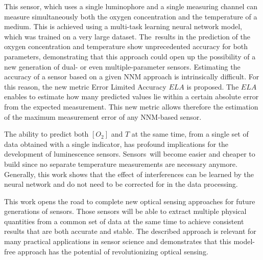 \documentclass[sensors,article,accept,moreauthors,pdftex,10pt,a4paper]{Definitions/mdpi}
\begin{document}
This sensor, which uses a single luminophore and a single measuring channel can measure simultaneously both the oxygen concentration and the temperature of a medium. This is achieved using a multi-task learning neural network model, which was trained on a very large dataset. The~results in the prediction of the oxygen concentration and temperature show unprecedented accuracy for both parameters, demonstrating that this approach could open up the possibility of a new generation of dual- or even multiple-parameter sensors.
Estimating the accuracy of a sensor based on a given NNM approach is intrinsically difficult. For this reason, the new metric Error Limited Accuracy $ELA$ is proposed. The $ELA$ enables to estimate how many predicted values lie within a certain absolute error from the expected measurement. This new metric allows therefore the estimation of the maximum measurement error of any NNM-based sensor.

The ability to predict both $[O_2]$ and $T$ at the same time, from a single set of data obtained with a single indicator, has profound implications for the development of luminescence sensors. Sensors~will become easier and cheaper to build since no separate temperature measurements are necessary anymore. Generally, this work shows that the effect of interferences can be learned by the neural network and do not need to be corrected for in the data processing. 

This work opens the road to complete new optical sensing approaches for future generations of sensors. Those sensors will be able to extract multiple physical quantities from a common set of data at the same time to achieve consistent results that are both accurate and stable. The described approach is relevant for many practical applications in sensor science and demonstrates that this model-free approach has the potential of revolutionizing optical sensing.




\vspace{6pt} 


\end{document}

